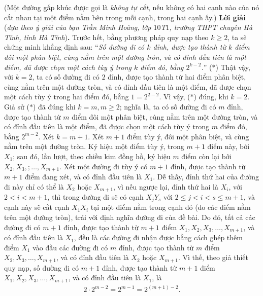 \begin{multicols}{2}
	\vskip 0.05cm
	(Một đường gấp khúc được gọi là \textit{không tự cắt}, nếu không có hai cạnh nào của nó cắt nhau tại một điểm nằm bên trong mỗi cạnh, trong hai cạnh ấy.)
	\vskip 0.05cm
	\textbf{\color{thachthuctoanhoc}Lời giải} (\textit{dựa theo ý giải của bạn Trần Minh Hoàng, lớp $10$T$1$, trường THPT chuyên Hà Tĩnh, tỉnh Hà Tĩnh})\textbf{\color{thachthuctoanhoc}.}
	\vskip 0.05cm
	Trước hết, bằng phương pháp quy nạp theo $k \ge 2$, ta sẽ chứng minh khẳng định sau:
	\vskip 0.05cm
	“\textit{Số đường đi có $k$ đỉnh, được tạo thành từ $k$ điểm đôi một phân biệt, cùng nằm trên một đường tròn, và có đỉnh đầu tiên là một điểm, đã được chọn một cách tùy ý trong $k$ điểm đó, bằng $2^{k-2}$.}”                  \hfill ($*$)
	\vskip 0.05cm
	Thật vậy, với $k = 2$, ta có số đường đi có $2$ đỉnh, được tạo thành từ hai điểm phân biệt, cùng nằm trên một đường tròn, và có đỉnh đầu tiên là một điểm, đã được chọn một cách tùy ý trong hai điểm đó, bằng $1 = 2^{2-2}$. Vì vậy, ($*$) đúng, khi $k = 2$.
	\vskip 0.05cm 
	Giả sử ($*$) đã đúng khi $k = m, m \ge 2$; nghĩa là, ta có số đường đi có $m$ đỉnh, được tạo thành từ $m$ điểm đôi một phân biệt, cùng nằm trên một đường tròn, và có đỉnh đầu tiên là một điểm, đã được chọn một cách tùy ý trong $m$ điểm đó, bằng $2^{m-2}$.
	\vskip 0.05cm 
	Xét $k = m + 1$.
	\vskip 0.05cm
	Xét $m + 1$ điểm tùy ý, đôi một phân biệt, và cùng nằm trên một đường tròn. Ký hiệu một điểm tùy ý, trong $m + 1$ điểm này, bởi $X_1$; sau đó, lần lượt, theo chiều kim đồng hồ, ký hiệu $m$ điểm còn lại bởi $X_2, X_3, ;\ldots, X_{m+1}$.
	\vskip 0.05cm  
	Xét một đường đi tùy ý có $m + 1$ đỉnh, được tạo thành từ $m + 1$ điểm đang xét, và có đỉnh đầu tiên là $X_1$. Dễ thấy, đỉnh thứ hai của đường đi này chỉ có thể là $X_2$  hoặc $X_{m+1}$, vì nếu ngược lại, đỉnh thứ hai là $X_i$, với $2 < i < m + 1$, thì trong đường đi sẽ có cạnh $X_jY_s$  với $2 \le j < i < s \le m + 1$, và cạnh này sẽ cắt cạnh  $X_1X_i$ tại một điểm nằm trong cạnh đó (do các điểm nằm trên một đường tròn), trái với định nghĩa đường đi của đề bài. Do đó, tất cả các đường đi có $m + 1$ đỉnh, được tạo thành từ $m + 1$ điểm $X_1, X_2, X_3, \ldots,X_{m+1}$, và có đỉnh đầu tiên là $X_1$, đều là các đường đi nhận được bằng cách ghép thêm điểm $X_1$ vào đầu các đường đi có $m$ đỉnh, được tạo thành từ $m$ điểm  $X_2, X_3, \ldots, X_{m+1}$, và có đỉnh đầu tiên là $X_2$  hoặc $X_{m+1}$. Vì thế, theo giả thiết quy nạp, số đường đi có $m + 1$ đỉnh, được tạo thành từ $m + 1$ điểm  $X_1, X_2, X_3, \ldots, X_{m+1}$, và có đỉnh đầu tiên là $X_1$, là
	\begin{align*}
		2 \cdot {2^{m - 2}} = {2^{m - 1}} = {2^{\left( {m + 1} \right) - 2}}.

\end{align*}
\end{multicols}
